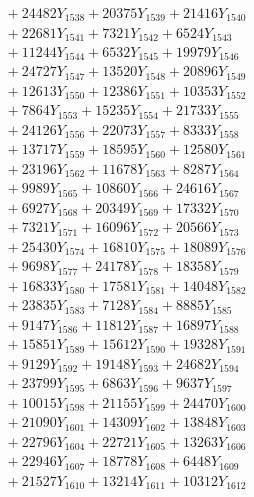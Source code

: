 \documentclass[a4paper,10pt]{article}
\begin{document}
{\begin{align}
&\;  + 24482 Y_{1538} + 20375 Y_{1539} + 21416 Y_{1540} \\[0.3ex]
&\;  + 22681 Y_{1541} + 7321 Y_{1542} + 6524 Y_{1543} \\[0.3ex]
&\;  + 11244 Y_{1544} + 6532 Y_{1545} + 19979 Y_{1546} \\[0.3ex]
&\;  + 24727 Y_{1547} + 13520 Y_{1548} + 20896 Y_{1549} \\[0.3ex]
&\;  + 12613 Y_{1550} + 12386 Y_{1551} + 10353 Y_{1552} \\[0.3ex]
&\;  + 7864 Y_{1553} + 15235 Y_{1554} + 21733 Y_{1555} \\[0.3ex]
&\;  + 24126 Y_{1556} + 22073 Y_{1557} + 8333 Y_{1558} \\[0.5ex]\allowbreak
&\;  + 13717 Y_{1559} + 18595 Y_{1560} + 12580 Y_{1561} \\[0.3ex]
&\;  + 23196 Y_{1562} + 11678 Y_{1563} + 8287 Y_{1564} \\[0.3ex]
&\;  + 9989 Y_{1565} + 10860 Y_{1566} + 24616 Y_{1567} \\[0.3ex]
&\;  + 6927 Y_{1568} + 20349 Y_{1569} + 17332 Y_{1570} \\[0.3ex]
&\;  + 7321 Y_{1571} + 16096 Y_{1572} + 20566 Y_{1573} \\[0.3ex]
&\;  + 25430 Y_{1574} + 16810 Y_{1575} + 18089 Y_{1576} \\[0.3ex]
&\;  + 9698 Y_{1577} + 24178 Y_{1578} + 18358 Y_{1579} \\[0.3ex]
&\;  + 16833 Y_{1580} + 17581 Y_{1581} + 14048 Y_{1582} \\[0.3ex]
&\;  + 23835 Y_{1583} + 7128 Y_{1584} + 8885 Y_{1585} \\[0.3ex]
&\;  + 9147 Y_{1586} + 11812 Y_{1587} + 16897 Y_{1588} \\[0.5ex]\allowbreak
&\;  + 15851 Y_{1589} + 15612 Y_{1590} + 19328 Y_{1591} \\[0.3ex]
&\;  + 9129 Y_{1592} + 19148 Y_{1593} + 24682 Y_{1594} \\[0.3ex]
&\;  + 23799 Y_{1595} + 6863 Y_{1596} + 9637 Y_{1597} \\[0.3ex]
&\;  + 10015 Y_{1598} + 21155 Y_{1599} + 24470 Y_{1600} \\[0.3ex]
&\;  + 21090 Y_{1601} + 14309 Y_{1602} + 13848 Y_{1603} \\[0.3ex]
&\;  + 22796 Y_{1604} + 22721 Y_{1605} + 13263 Y_{1606} \\[0.3ex]
&\;  + 22946 Y_{1607} + 18778 Y_{1608} + 6448 Y_{1609} \\[0.3ex]
&\;  + 21527 Y_{1610} + 13214 Y_{1611} + 10312 Y_{1612} \\[0.3ex]

\end{align}}
\end{document}

